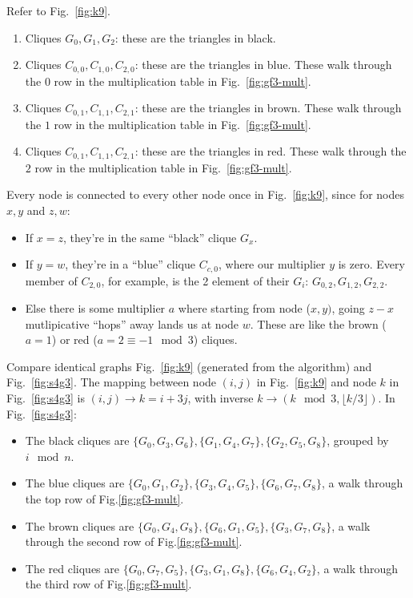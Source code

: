 \documentclass[11pt, oneside]{article} 	%
\begin{document}
Refer to Fig.~\ref{fig:k9}.

\begin{enumerate}
\item Cliques $G_0, G_1, G_2$: these are the triangles in black. 
\item Cliques $C_{0,0}, C_{1, 0}, C_{2,0}$: these are the triangles in blue. These walk through the $0$ row in the multiplication table in Fig.~\ref{fig:gf3-mult}.
\item Cliques $C_{0,1}, C_{1, 1}, C_{2,1}$: these are the triangles in brown. These walk through the $1$ row in the multiplication table in Fig.~\ref{fig:gf3-mult}.
\item Cliques $C_{0,1}, C_{1, 1}, C_{2,1}$: these are the triangles in red. These walk through the $2$ row in the multiplication table in Fig.~\ref{fig:gf3-mult}.
\end{enumerate}


Every node is connected to every other node once in Fig.~\ref{fig:k9}, since for nodes $x,y$ and $z,w$:
\begin{itemize}
\item If $x = z$, they're in the same ``black'' clique $G_x$.
\item If $y=w$, they're in a ``blue'' clique $C_{c,0}$, where our multiplier $y$ is zero. Every member of $C_{2,0}$, for example, is the 2 element of their $G_i$: $G_{0,2}, G_{1,2}, G_{2,2}$.
\item Else there is some multiplier $a$ where starting from node ($x,y)$, going $z-x$ mutlipicative ``hops'' away lands us at node $w$. These are like the brown ($a=1$) or red ($a=2\equiv -1 \mod 3 $) cliques.
\end{itemize}

Compare identical graphs Fig.~\ref{fig:k9} (generated from the algorithm) and Fig.~\ref{fig:s4g3}. The mapping between node $(i,j)$ in Fig.~\ref{fig:k9} and node $k$ in Fig.~\ref{fig:s4g3} is $(i,j) \rightarrow k=i+3j$, with inverse $k \rightarrow (k \mod 3, \lfloor k / 3 \rfloor)$. In Fig.~\ref{fig:s4g3}:
\begin{itemize}
\item The black cliques are $\{G_0, G_3, G_6\}, \{G_1, G_4, G_7\}, \{G_2, G_5, G_8\}$, grouped by $i \mod n$.
\item The blue cliques are $\{G_0, G_1, G_2\}, \{G_3, G_4, G_5\}, \{G_6, G_7, G_8\}$, a walk through the top row of Fig.\ref{fig:gf3-mult}.
\item The brown cliques are $\{G_0, G_4, G_8\}, \{G_6, G_1, G_5\}, \{G_3, G_7, G_8\}$, a walk through the second row of Fig.\ref{fig:gf3-mult}.
\item The red cliques are $\{G_0, G_7, G_5\}, \{G_3, G_1, G_8\}, \{G_6, G_4, G_2\}$, a walk through the third row of Fig.\ref{fig:gf3-mult}.
\end{itemize}
\end{document}
